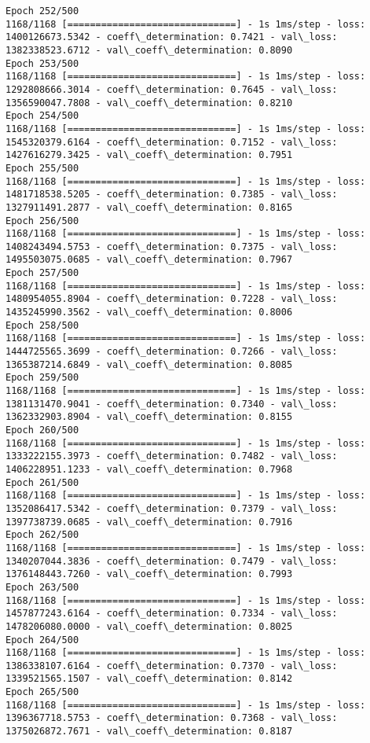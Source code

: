 \documentclass[11pt]{article}
\begin{document}
\begin{Verbatim}[commandchars=\\\{\}]
Epoch 252/500
1168/1168 [==============================] - 1s 1ms/step - loss: 1400126673.5342 - coeff\_determination: 0.7421 - val\_loss: 1382338523.6712 - val\_coeff\_determination: 0.8090
Epoch 253/500
1168/1168 [==============================] - 1s 1ms/step - loss: 1292808666.3014 - coeff\_determination: 0.7645 - val\_loss: 1356590047.7808 - val\_coeff\_determination: 0.8210
Epoch 254/500
1168/1168 [==============================] - 1s 1ms/step - loss: 1545320379.6164 - coeff\_determination: 0.7152 - val\_loss: 1427616279.3425 - val\_coeff\_determination: 0.7951
Epoch 255/500
1168/1168 [==============================] - 1s 1ms/step - loss: 1481718538.5205 - coeff\_determination: 0.7385 - val\_loss: 1327911491.2877 - val\_coeff\_determination: 0.8165
Epoch 256/500
1168/1168 [==============================] - 1s 1ms/step - loss: 1408243494.5753 - coeff\_determination: 0.7375 - val\_loss: 1495503075.0685 - val\_coeff\_determination: 0.7967
Epoch 257/500
1168/1168 [==============================] - 1s 1ms/step - loss: 1480954055.8904 - coeff\_determination: 0.7228 - val\_loss: 1435245990.3562 - val\_coeff\_determination: 0.8006
Epoch 258/500
1168/1168 [==============================] - 1s 1ms/step - loss: 1444725565.3699 - coeff\_determination: 0.7266 - val\_loss: 1365387214.6849 - val\_coeff\_determination: 0.8085
Epoch 259/500
1168/1168 [==============================] - 1s 1ms/step - loss: 1381131470.9041 - coeff\_determination: 0.7340 - val\_loss: 1362332903.8904 - val\_coeff\_determination: 0.8155
Epoch 260/500
1168/1168 [==============================] - 1s 1ms/step - loss: 1333222155.3973 - coeff\_determination: 0.7482 - val\_loss: 1406228951.1233 - val\_coeff\_determination: 0.7968
Epoch 261/500
1168/1168 [==============================] - 1s 1ms/step - loss: 1352086417.5342 - coeff\_determination: 0.7379 - val\_loss: 1397738739.0685 - val\_coeff\_determination: 0.7916
Epoch 262/500
1168/1168 [==============================] - 1s 1ms/step - loss: 1340207044.3836 - coeff\_determination: 0.7479 - val\_loss: 1376148443.7260 - val\_coeff\_determination: 0.7993
Epoch 263/500
1168/1168 [==============================] - 1s 1ms/step - loss: 1457877243.6164 - coeff\_determination: 0.7334 - val\_loss: 1478206080.0000 - val\_coeff\_determination: 0.8025
Epoch 264/500
1168/1168 [==============================] - 1s 1ms/step - loss: 1386338107.6164 - coeff\_determination: 0.7370 - val\_loss: 1339521565.1507 - val\_coeff\_determination: 0.8142
Epoch 265/500
1168/1168 [==============================] - 1s 1ms/step - loss: 1396367718.5753 - coeff\_determination: 0.7368 - val\_loss: 1375026872.7671 - val\_coeff\_determination: 0.8187

\end{Verbatim}
\end{document}
